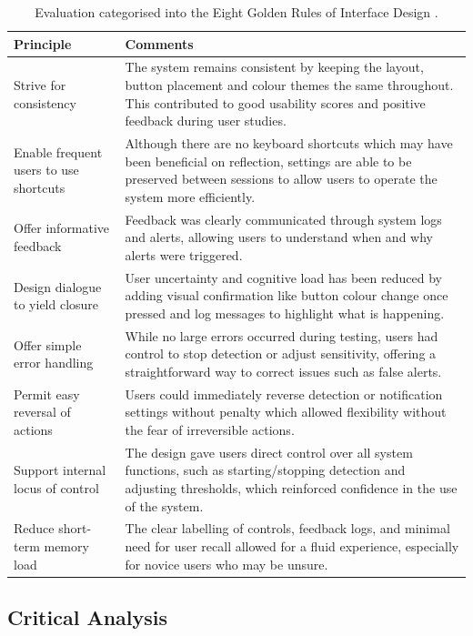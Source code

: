 \documentclass[12pt]{article}
\theoremstyle{plain}
\theoremstyle{definition}
\begin{document}
\begin{table}[h!]
\centering
\begin{tabularx}{\textwidth}{|l|X|}
\hline
\textbf{Principle} & \textbf{Comments} \\
\hline
Strive for consistency & The system remains consistent by keeping the layout, button placement and colour themes the same throughout. This contributed to good usability scores and positive feedback during user studies. \\
\hline
Enable frequent users to use shortcuts & Although there are no keyboard shortcuts which may have been beneficial on reflection, settings are able to be preserved between sessions to allow users to operate the system more efficiently. \\
\hline
Offer informative feedback & Feedback was clearly communicated through system logs and alerts, allowing users to understand when and why alerts were triggered. \\
\hline
Design dialogue to yield closure & User uncertainty and cognitive load has been reduced by adding visual confirmation like button colour change once pressed and log messages to highlight what is happening. \\
\hline
Offer simple error handling & While no large errors occurred during testing, users had control to stop detection or adjust sensitivity, offering a straightforward way to correct issues such as false alerts. \\
\hline
Permit easy reversal of actions & Users could immediately reverse detection or notification settings without penalty which allowed flexibility without the fear of irreversible actions. \\
\hline
Support internal locus of control & The design gave users direct control over all system functions, such as starting/stopping detection and adjusting thresholds, which reinforced confidence in the use of the system. \\
\hline
Reduce short-term memory load & The clear labelling of controls, feedback logs, and minimal need for user recall allowed for a fluid experience, especially for novice users who may be unsure. \\
\hline
\end{tabularx}
\caption{Evaluation categorised into the Eight Golden Rules of Interface Design \cite{ben_shneiderman_ben_nodate}.}
\label{golden_rules}
\end{table}

\subsection{Critical Analysis}
\end{document}
